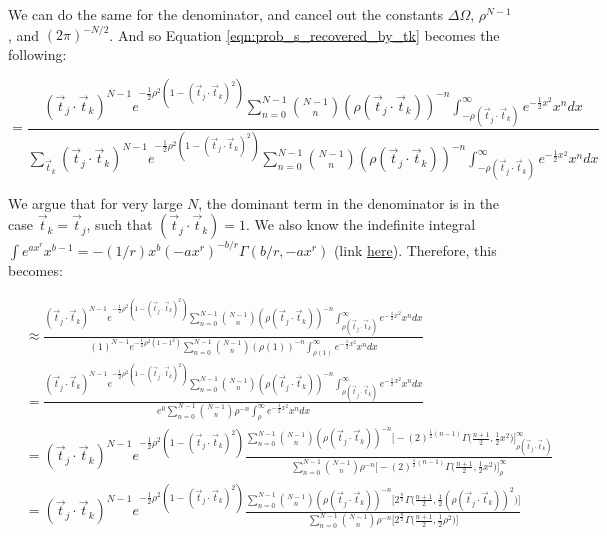 \documentclass[12pt]{article}
\newcommand{\ptjtk}{\rho(\vec{t}_j\cdot\vec{t}_k)}
\newcommand{\tjtk}{(\vec{t}_j\cdot\vec{t}_k)}
\begin{document}
We can do the same for the denominator, and cancel out the constants $\Delta\Omega$, $\rho^{N-1}$, and $(2\pi)^{-N/2}$. And so Equation \ref{eqn:prob_s_recovered_by_tk} becomes the following:
   
   \begin{equation}
   =  \frac{ \tjtk^{N-1}e^{-\frac{1}{2}\rho^2(1-\tjtk^2)} \sum_{n=0}^{N-1} \binom{N-1}{n} (\ptjtk)^{-n} \int^{\infty}_{-\ptjtk} e^{-\frac{1}{2}x^2}x^n dx} { \sum_{\vec{t}_k} \tjtk^{N-1}e^{-\frac{1}{2}\rho^2(1-\tjtk^2)} \sum_{n=0}^{N-1} \binom{N-1}{n} (\ptjtk)^{-n} \int^{\infty}_{-\ptjtk} e^{-\frac{1}{2}x^2}x^n dx}
   \end{equation}

We argue that for very large $N$, the dominant term in the denominator is in the case $\vec{t}_k = \vec{t}_j$, such that $\tjtk = 1$. We also know the indefinite integral $\int e^{ax^r}x^{b-1} = -(1/r) x^b (-ax^r)^{-b/r} \Gamma(b/r,-ax^r)$ (link \href{http://functions.wolfram.com/ElementaryFunctions/Exp/21/01/02/01/01/08/0001/}{here}). Therefore, this becomes:

   \begin{align}
   &\approx  \frac{ \tjtk^{N-1}e^{-\frac{1}{2}\rho^2(1-\tjtk^2)} \sum_{n=0}^{N-1} \binom{N-1}{n} (\ptjtk)^{-n} \int^{\infty}_{\ptjtk} e^{-\frac{1}{2}x^2}x^n dx} 
   { (1)^{N-1}e^{-\frac{1}{2}\rho^2(1-1^2)} \sum_{n=0}^{N-1} \binom{N-1}{n} (\rho(1))^{-n} \int^{\infty}_{\rho(1)} e^{-\frac{1}{2}x^2}x^n dx} \\
   &= \frac{ \tjtk^{N-1}e^{-\frac{1}{2}\rho^2(1-\tjtk^2)} \sum_{n=0}^{N-1} \binom{N-1}{n} (\ptjtk)^{-n} \int^{\infty}_{\ptjtk} e^{-\frac{1}{2}x^2}x^n dx} 
   { e^0\sum_{n=0}^{N-1} \binom{N-1}{n} \rho^{-n} \int^{\infty}_{\rho} e^{-\frac{1}{2}x^2}x^n dx} \\
   &= \tjtk^{N-1}e^{-\frac{1}{2}\rho^2(1-\tjtk^2)} \frac{ \sum_{n=0}^{N-1} \binom{N-1}{n} (\ptjtk)^{-n} \Big[ -(2)^{\frac{1}{2}(n-1)}\Gamma\Big(\frac{n+1}{2},\frac{1}{2}x^2\Big) \Big]^{\infty}_{\ptjtk} } 
   { \sum_{n=0}^{N-1} \binom{N-1}{n} \rho^{-n}  \Big[ -(2)^{\frac{1}{2}(n-1)}\Gamma\Big(\frac{n+1}{2},\frac{1}{2}x^2\Big) \Big]^{\infty}_{\rho} } \\
   &= \tjtk^{N-1}e^{-\frac{1}{2}\rho^2(1-\tjtk^2)} \frac{ \sum_{n=0}^{N-1} \binom{N-1}{n} (\ptjtk)^{-n} \Big[ 2^{\frac{n}{2}}\Gamma\Big(\frac{n+1}{2},\frac{1}{2}(\ptjtk)^2\Big) \Big]} 
   { \sum_{n=0}^{N-1} \binom{N-1}{n} \rho^{-n}  \Big[ 2^{\frac{n}{2}}\Gamma\Big(\frac{n+1}{2},\frac{1}{2}\rho^2\Big) \Big] }
   \end{align}
   
\end{document}
